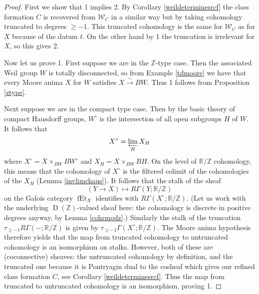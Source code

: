 \documentclass[12pt]{article}
\theoremstyle{definition}
\newcommand{\on}{\operatorname}
\newcommand{\mc}{\mathcal}
\newcommand{\mbb}{\mathbb}
\begin{document}
\begin{proof}
First we show that 1 implies 2.  By Corollary \ref{weildeterminesrcf} the class formation $C$ is recovered from $\mc{W}_C$ in a similar way but by taking cohomology truncated to degrees $\geq -1$.  This truncated cohomology is the same for $\mc{W}_C$ as for $X$ because of the datum $t$.  On the other hand by 1 the truncation is irrelevant for $X$, so this gives 2.

Now let us prove 1.  First suppose we are in the $\mbb{Z}$-type case.  Then the associated Weil group $W$ is totally disconnected, so from Example \ref{tdmoore} we have that every Moore anima $X$ for $W$ satisfies $X\overset{\sim}{\rightarrow} BW$.  Thus 1 follows from Proposition \ref{ztype}.

Next suppose we are in the compact type case.  Then by the basic theory of compact Hausdorff groups, $W^\circ$ is the intersection of all open subgroups $H$ of $W$.  It follows that
$$X^\circ = \varprojlim_H X_H$$
where $X^\circ=X\times_{BW}BW^\circ$ and $X_H=X\times_{BW}BH$. On the level of $\mbb{R}/\mbb{Z}$ cohomology, this means that the cohomology of $X^\circ$ is the filtered colimit of the cohomologies of the $X_H$ (Lemma \ref{invlimchaus}).  It follows that the stalk of the sheaf
$$(Y\to X)\mapsto R\Gamma(Y;\mbb{R}/\mbb{Z})$$
on the Galois category $\on{fEt}_X$ identifies with $R\Gamma(X^\circ;\mbb{R}/\mbb{Z})$.  (Let us work with the underlying $\on{D}(\mbb{Z})$-valued sheaf here: the cohomology is discrete in positive degrees anyway, by Lemma \ref{cohrmodz}.) Similarly the stalk of the truncation $\tau_{\geq -1}R\Gamma(-;\mbb{R}/\mbb{Z})$ is given by $\tau_{\geq -1}\Gamma(X^\circ;\mbb{R}/\mbb{Z})$.  The Moore anima hypothesis therefore yields that the map from truncated cohomology to untruncated cohomology is an isomorphism on stalks.  However, both of these are (coconnective) sheaves: the untruncated cohomology by definition, and the truncated one because it is Pontryagin dual to the cosheaf which gives our refined class formation $C$, see Corollary \ref{weildeterminesrcf}.  Thus the map from truncated to untruncated cohomology is an isomorphism, proving 1.


\end{proof}
\end{document}
